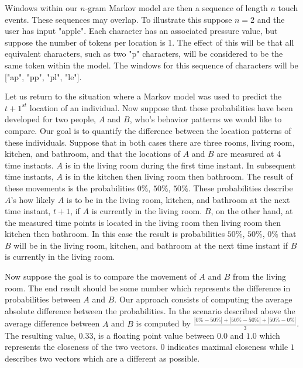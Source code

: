 Windows within our $n$-gram Markov model are then
a sequence of length $n$ touch events.
%
These sequences may overlap.
To illustrate this suppose $n = 2$ and the user has input "apple".
Each character has an associated pressure value,
but suppose the number of tokens per location is 1.
The effect of this will be that all equivalent characters,
such as two "p" characters, 
will be considered to be the same token within the model.
The windows for this sequence of characters will be
["ap", "pp", "pl", "le"].
%

Let us return to the situation where
a Markov model was used to predict the $t+1^{st}$ location
of an individual.
Now suppose that these probabilities have been developed for
two people, $A$ and $B$, who's behavior patterns we would like to
compare.
Our goal is to quantify the difference between
the location patterns of these individuals.
Suppose that in both cases there are three rooms,
living room, kitchen, and bathroom, and
that the locations of $A$ and $B$ are measured at 4 time instants.
%
$A$ is in the living room during the first time instant.
In subsequent time instants,
$A$ is in the kitchen then living room then bathroom.
The result of these movements is 
the probabilities $0\%$, $50\%$, $50\%$.
These probabilities describe $A$'s how likely
$A$ is to be in the
living room, kitchen, and bathroom at the next time instant, $t+1$,
if $A$ is currently in the living room.
%
$B$, on the other hand,
at the measured time points is located in
the living room then living room then kitchen then bathroom.
In this case the
result is probabilities $50\%$, $50\%$, $0\%$ 
that $B$ will be in the
living room, kitchen, and bathroom at the next time instant
if $B$ is currently in the living room.
%

Now suppose the goal is to compare the 
movement of $A$ and $B$ from the living room.
The end result should be some number which represents
the difference in probabilities between $A$ and $B$.
%
Our approach consists of computing
the average absolute difference between the probabilities.
%
In the scenario described above
the average difference between $A$ and $B$ 
is computed by
$\frac{|0\%-50\%| + |50\%-50\%| + |50\%-0\%|}{3}$.
The resulting value, $0.33$, is a floating point value
between $0.0$ and $1.0$ which represents
the closeness of the two vectors.
$0$ indicates maximal closeness while
$1$ describes two vectors which are a different as possible.
%

